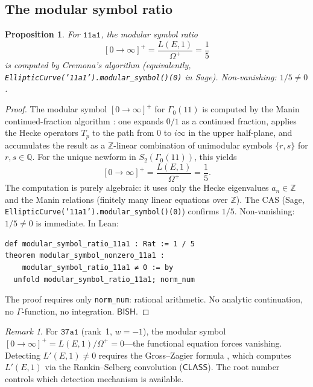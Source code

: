 \documentclass[11pt]{article}
\theoremstyle{plain}
\newtheorem{proposition}[theorem]{Proposition}
\theoremstyle{definition}
\theoremstyle{remark}
\newtheorem{remark}[theorem]{Remark}
\newcommand{\Z}{\mathbb{Z}}
\newcommand{\Q}{\mathbb{Q}}
\newcommand{\BISH}{\ensuremath{\mathsf{BISH}}}
\newcommand{\CLASS}{\ensuremath{\mathsf{CLASS}}}
\begin{document}
\subsection{The modular symbol ratio}

\begin{proposition}\label{prop:modsym}
For $\texttt{11a1}$, the modular symbol ratio
\[
[0 \to \infty]^+ = \frac{L(E,1)}{\Omega^+} = \frac{1}{5}
\]
is computed by Cremona's algorithm \cite{cremona} (equivalently, \texttt{EllipticCurve('11a1').modular\_symbol()(0)} in Sage). Non-vanishing: $1/5 \neq 0$.
\end{proposition}

\begin{proof}
The modular symbol $[0 \to \infty]^+$ for $\Gamma_0(11)$ is computed by the Manin continued-fraction algorithm \cite{cremona}: one expands $0/1$ as a continued fraction, applies the Hecke operators $T_p$ to the path from $0$ to $i\infty$ in the upper half-plane, and accumulates the result as a $\Z$-linear combination of unimodular symbols $\{r, s\}$ for $r, s \in \Q$. For the unique newform in $S_2(\Gamma_0(11))$, this yields
\[
[0 \to \infty]^+ = \frac{L(E,1)}{\Omega^+} = \frac{1}{5}.
\]
The computation is purely algebraic: it uses only the Hecke eigenvalues $a_n \in \Z$ and the Manin relations (finitely many linear equations over $\Z$). The CAS (Sage, \texttt{EllipticCurve('11a1').modular\_symbol()(0)}) confirms $1/5$. Non-vanishing: $1/5 \neq 0$ is immediate. In Lean:
\begin{lstlisting}[style=leanstyle]
def modular_symbol_ratio_11a1 : Rat := 1 / 5
theorem modular_symbol_nonzero_11a1 :
    modular_symbol_ratio_11a1 ≠ 0 := by
  unfold modular_symbol_ratio_11a1; norm_num
\end{lstlisting}
The proof requires only \texttt{norm\_num}: rational arithmetic. No analytic continuation, no $\Gamma$-function, no integration. $\BISH$.
\end{proof}

\begin{remark}\label{rem:detection-contrast}
For $\texttt{37a1}$ (rank~1, $w = -1$), the modular symbol $[0 \to \infty]^+ = L(E,1)/\Omega^+ = 0$---the functional equation forces vanishing. Detecting $L'(E,1) \neq 0$ requires the Gross--Zagier formula \cite{gross-zagier}, which computes $L'(E,1)$ via the Rankin--Selberg convolution ($\CLASS$). The root number controls which detection mechanism is available.
\end{remark}


\end{document}
